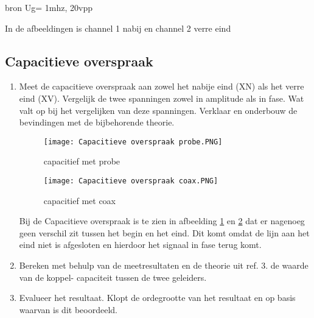 bron Ug= 1mhz, 20vpp

In de afbeeldingen is channel 1 nabij en channel 2 verre eind

\subsection{Capacitieve overspraak}
\begin{enumerate}
    \item Meet de capacitieve overspraak aan zowel het nabije eind (XN) als het verre eind (XV).
    Vergelijk de twee spanningen zowel in amplitude als in fase. Wat valt op bij het vergelijken
    van deze spanningen. Verklaar en onderbouw de bevindingen met de bijbehorende theorie.

    \begin{figure}[H]
        \centering
        \texttt{[image: Capacitieve overspraak probe.PNG]}
        \caption{capacitief met probe}
        \label{fig:capacitief met probe}
    \end{figure}

    \begin{figure}[H]
        \centering
        \texttt{[image: Capacitieve overspraak coax.PNG]}
        \caption{capacitief met coax}
        \label{fig:capacitief met coax}
    \end{figure}

    Bij de Capacitieve overspraak is te zien in afbeelding \ref{fig:capacitief met probe} en \ref{fig:capacitief met coax} dat er nagenoeg geen verschil zit tussen het begin en het eind. Dit komt omdat de lijn aan het eind niet is afgesloten en hierdoor het signaal in fase terug komt.


    \item  Bereken met behulp van de meetresultaten en de theorie uit ref. 3. de waarde van de
    koppel- capaciteit tussen de twee geleiders.

    \item Evalueer het resultaat. Klopt de ordegrootte van het resultaat en op basis waarvan is dit beoordeeld.
\end{enumerate}

